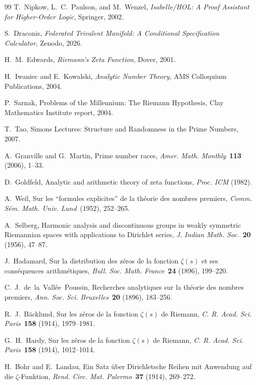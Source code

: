 \documentclass[12pt]{article}
\theoremstyle{plain}
\theoremstyle{definition}
\begin{document}
\begin{thebibliography}{99}
T.~Nipkow, L.~C.~Paulson, and M.~Wenzel,
\emph{Isabelle/HOL: A Proof Assistant for Higher-Order Logic},
Springer, 2002.

S.~Draconis,
\emph{Federated Trivalent Manifold: A Conditional Specification Calculator},
Zenodo, 2026.

H.~M.~Edwards,
\emph{Riemann's Zeta Function},
Dover, 2001.

H.~Iwaniec and E.~Kowalski,
\emph{Analytic Number Theory},
AMS Colloquium Publications, 2004.

P.~Sarnak,
Problems of the Millennium: The Riemann Hypothesis,
Clay Mathematics Institute report, 2004.

T.~Tao,
Simons Lectures: Structure and Randomness in the Prime Numbers, 2007.

A.~Granville and G.~Martin,
Prime number races,
\emph{Amer. Math. Monthly}\ \textbf{113} (2006), 1--33.

D.~Goldfeld,
Analytic and arithmetic theory of zeta functions,
\emph{Proc. ICM} (1982).

A.~Weil,
Sur les ``formules explicites'' de la th\'eorie des nombres premiers,
\emph{Comm. S\'em. Math. Univ. Lund}\ (1952), 252--265.

A.~Selberg,
Harmonic analysis and discontinuous groups in weakly symmetric Riemannian
spaces with applications to Dirichlet series,
\emph{J. Indian Math. Soc.}\ \textbf{20} (1956), 47--87.

J.~Hadamard,
Sur la distribution des z\'eros de la fonction $\zeta(s)$ et ses
cons\'equences arithm\'etiques,
\emph{Bull. Soc. Math. France}\ \textbf{24} (1896), 199--220.

C.~J.~de~la~Vall\'ee~Poussin,
Recherches analytiques sur la th\'eorie des nombres premiers,
\emph{Ann. Soc. Sci. Bruxelles}\ \textbf{20} (1896), 183--256.

R.~J.~B\"acklund,
Sur les z\'eros de la fonction $\zeta(s)$ de Riemann,
\emph{C. R. Acad. Sci. Paris}\ \textbf{158} (1914), 1979--1981.

G.~H.~Hardy,
Sur les z\'eros de la fonction $\zeta(s)$ de Riemann,
\emph{C. R. Acad. Sci. Paris}\ \textbf{158} (1914), 1012--1014.

H.~Bohr and E.~Landau,
Ein Satz \"uber Dirichletsche Reihen mit Anwendung auf die
$\zeta$-Funktion,
\emph{Rend. Circ. Mat. Palermo}\ \textbf{37} (1914), 269--272.


\end{thebibliography}
\end{document}

